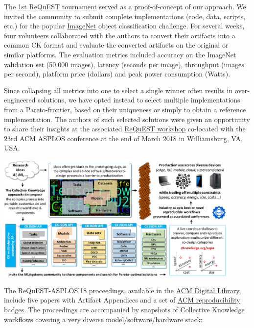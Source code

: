 \documentclass[10pt,onecolumn]{article}
\begin{document}
The \href{http://cknowledge.org/request-cfp-asplos2018.html}{1st ReQuEST tournament} 
served as a proof-of-concept of our approach. We invited the community to submit complete
implementations (code, data, scripts, etc.) for the popular
\href{http://www.image-net.org}{ImageNet} object classification challenge. For several weeks,
four volunteers collaborated with the authors to convert their
artifacts into a common CK format and evaluate the converted
artifacts on the original or similar platforms. The evaluation
metrics included accuracy on the ImageNet validation set
(50,000 images), latency (seconds per image), throughput
(images per second), platform price (dollars) and peak power
consumption (Watts).

Since collapsing all metrics into one to select a single
winner often results in over-engineered solutions, we have
opted instead to select multiple implementations from
a Pareto-frontier, based on their uniqueness or simply
to obtain a reference implementation. The authors of such
selected solutions were given an opportunity to share their
insights at the associated \href{http://cknowledge.org/request-cfp-asplos2018.html}{ReQuEST workshop} 
co-located with the 23rd ACM ASPLOS conference at the end of March 2018
in Williamsburg, VA, USA.

\begin{center}
\includegraphics[width=0.9\textwidth]{figures/ck-request-concept-cropped.pdf}
\end{center}

The ReQuEST-ASPLOS'18 proceedings, available in the 
\href{https://dl.acm.org}{ACM Digital Library}, include five papers with Artifact Appendices
and a set of \href{https://www.acm.org/publications/policies/artifact-review-badging}{ACM reproducibility badges}. 
The proceedings are accompanied by snapshots of Collective Knowledge workflows
covering a very diverse model/software/hardware stack:
\end{document}
